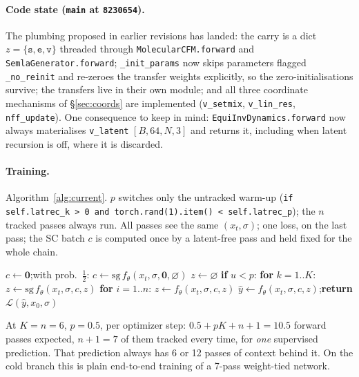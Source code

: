 \documentclass[11pt,a4paper]{article}
\newcommand{\sg}{\mathrm{sg}}
\newcommand{\code}[1]{\texttt{#1}}
\begin{document}
\paragraph{Code state (\code{main} at \code{8230654}).} The plumbing proposed in
earlier revisions has landed: the carry is a dict $z=\{\code{s},\code{e},\code{v}\}$
threaded through \code{MolecularCFM.forward} and \code{SemlaGenerator.forward};
\code{\_init\_params} now skips parameters flagged \code{\_no\_reinit} and re-zeroes the
transfer weights explicitly, so the zero-initialisations survive; the transfers live in
their own module; and all three coordinate mechanisms of
\S\ref{sec:coords} are implemented (\code{v\_setmix}, \code{v\_lin\_res},
\code{nff\_update}). One consequence to keep in mind: \code{EquiInvDynamics.forward} now
always materialises \code{v\_latent} $[B,64,N,3]$ and returns it, including when latent
recursion is off, where it is discarded.

\paragraph{Training.} Algorithm~\ref{alg:current}. $p$ switches only the untracked
warm-up (\code{if self.latrec\_k > 0 and torch.rand(1).item() < self.latrec\_p}); the $n$ tracked passes
always run. All passes see the same $(x_t,\sigma)$; one loss, on the last pass; the SC
batch $c$ is computed once by a latent-free pass and held fixed for the whole chain.

\begin{algorithm}[h]
\caption{Current training step}\label{alg:current}
\begin{algorithmic}[1]
  \State $c \gets \mathbf{0}$;\quad with prob.\ $\tfrac12$: $c \gets \sg\,f_\theta(x_t,\sigma,\mathbf{0},\varnothing)$ 
  \State $z \gets \varnothing$
  \State \textbf{if} $u<p$: \textbf{for} $k=1..K$: $z \gets \sg\,f_\theta(x_t,\sigma,c,z)$ 
  \State \textbf{for} $i=1..n$: $z \gets f_\theta(x_t,\sigma,c,z)$ 
  \State $\hat y \gets f_\theta(x_t,\sigma,c,z)$;\quad \textbf{return} $\mathcal L(\hat y, x_0,\sigma)$
\end{algorithmic}
\end{algorithm}

At $K{=}n{=}6$, $p{=}0.5$, per optimizer step: $0.5 + pK + n + 1 = 10.5$ forward passes
expected, $n+1 = 7$ of them tracked every time, for \emph{one} supervised prediction.
That prediction always has 6 or 12 passes of context behind it. On the cold branch this
is plain end-to-end training of a 7-pass weight-tied network.
\end{document}
